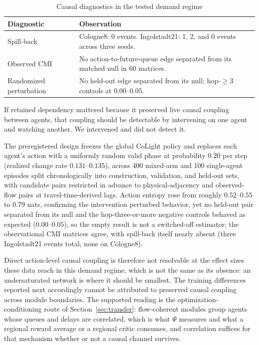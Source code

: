\documentclass[journal]{IEEEtran}
\theoremstyle{definition}
\begin{document}
\begin{table}[t]
    \centering
    \caption{Causal diagnostics in the tested demand regime}
    \label{tab:causal}
    \footnotesize
    \begin{tabular}{@{}p{}p{}@{}}
        \toprule
        Diagnostic              & Observation                                                                       \\
        \midrule
        Spill-back              & Cologne8: 0 events. Ingolstadt21: 1, 2, and 0 events across three seeds.          \\
        Observed CMI            & No action-to-future-queue edge separated from its matched null in 60 matrices.    \\
        Randomized perturbation & No held-out edge separated from its null; hop-$\geq3$ controls at $0.00$--$0.05$. \\
        \bottomrule
    \end{tabular}
\end{table}

If retained dependency mattered because it preserved live causal coupling between agents, that coupling should be detectable by intervening on one agent and watching another.
We intervened and did not detect it.

The preregistered design freezes the global CoLight policy and replaces each agent's action with a uniformly random valid phase at probability $0.20$ per step (realized change rate $0.131$--$0.135$), across 400 mixed-arm and 100 single-agent episodes split chronologically into construction, validation, and held-out sets, with candidate pairs restricted in advance to physical-adjacency and observed-flow pairs at travel-time-derived lags. Action entropy rose from roughly $0.52$--$0.55$ to $0.79$ nats, confirming the intervention perturbed behavior, yet no held-out pair separated from its null and the hop-three-or-more negative controls behaved as expected ($0.00$--$0.05$), so the empty result is not a switched-off estimator; the observational CMI matrices agree, with spill-back itself nearly absent (three Ingolstadt21 events total, none on Cologne8).

Direct action-level causal coupling is therefore not resolvable at the effect sizes these data reach in this demand regime, which is not the same as its absence: an undersaturated network is where it should be smallest. The training differences reported next accordingly cannot be attributed to preserved causal coupling across module boundaries. The supported reading is the optimization-conditioning route of Section~\ref{sec:transfer}: flow-coherent modules group agents whose queues and delays are correlated, which is what $\Psi$ measures and what a regional reward average or a regional critic consumes, and correlation suffices for that mechanism whether or not a causal channel survives.
\end{document}
